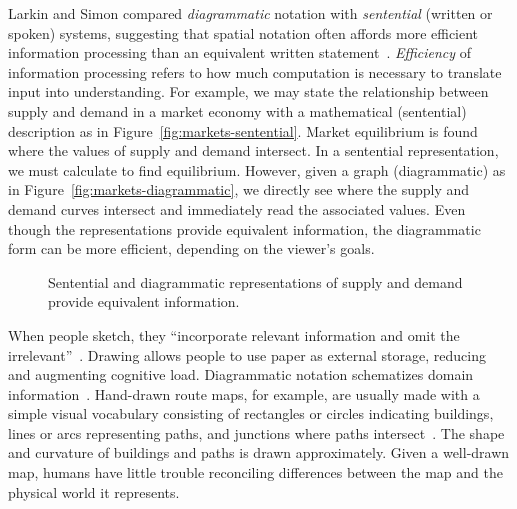 Larkin and Simon compared \textit{diagrammatic} notation
with \textit{sentential} (written or spoken) systems, suggesting that
spatial notation often affords more efficient information processing
than an equivalent written
statement~\cite{larkin-diagrams}. \textit{Efficiency} of information
processing refers to how much computation is necessary to translate
input into understanding. For example, we may state the relationship
between supply and demand in a market economy with a mathematical
(sentential) description as in
Figure~\ref{fig:markets-sentential}. Market equilibrium is found where
the values of supply and demand intersect. In a sentential
representation, we must calculate to find equilibrium. However, given
a graph (diagrammatic) as in Figure~\ref{fig:markets-diagrammatic}, we
directly see where the supply and demand curves intersect and
immediately read the associated values. Even though the
representations provide equivalent information, the diagrammatic form
can be more efficient, depending on the viewer's goals.

\begin{figure}
  \centering
  \hspace{0.5cm}
  \caption{Sentential and diagrammatic representations of supply and
  demand provide equivalent information.}
  \label{fig:markets}
\end{figure}

When people sketch, they ``incorporate relevant information and omit
the irrelevant''~\cite{tversky-sketching-thinking}. Drawing allows
people to use paper as external storage, reducing and augmenting
cognitive load. Diagrammatic notation schematizes domain
information~\cite{tversky-diagrammatic-communication}. Hand-drawn
route maps, for example, are usually made with a simple visual
vocabulary consisting of rectangles or circles indicating buildings,
lines or arcs representing paths, and junctions where paths
intersect~\cite{tversky-routes}. The shape and curvature of buildings
and paths is drawn approximately. Given a well-drawn map, humans have
little trouble reconciling differences between the map and the
physical world it represents.

